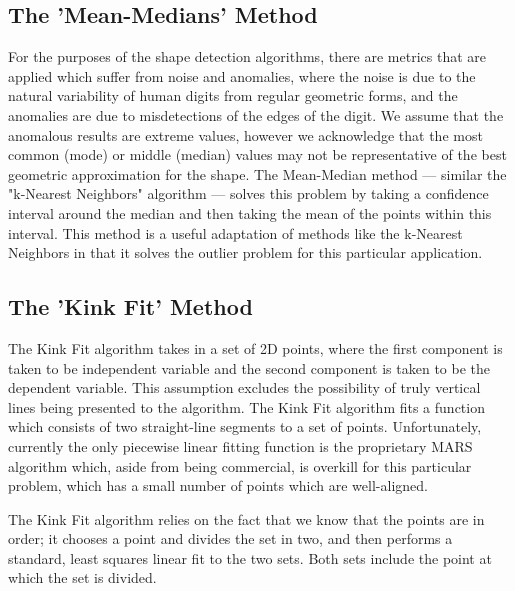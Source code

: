 \subsection{The 'Mean-Medians' Method}\label{sec:MeanMedians}
For the purposes of the shape detection algorithms, there are metrics that are applied which suffer from noise and anomalies, where the noise is due to the natural variability of human digits from regular geometric forms, and the anomalies are due to misdetections of the edges of the digit. We assume that the anomalous results are extreme values, however we acknowledge that the most common (mode) or middle (median) values may not be representative of the best geometric approximation for the shape. The Mean-Median method --- similar the "k-Nearest Neighbors" algorithm --- solves this problem by taking a confidence interval around the median and then taking the mean of the points within this interval. This method is a useful adaptation of methods like the k-Nearest Neighbors in that it solves the outlier problem for this particular application.

\subsection{The 'Kink Fit' Method}\label{sec:KinkFitMethod}
The Kink Fit algorithm takes in a set of 2D points, where the first component is taken to be independent variable and the second component is taken to be the dependent variable. This assumption excludes the possibility of truly vertical lines being presented to the algorithm. The Kink Fit algorithm fits a function which consists of two straight-line segments to a set of points. Unfortunately, currently the only piecewise linear fitting function is the proprietary MARS algorithm which, aside from being commercial, is overkill for this particular problem, which has a small number of points which are well-aligned. 

The Kink Fit algorithm relies on the fact that we know that the points are in order; it chooses a point and divides the set in two, and then performs a standard, least squares linear fit to the two sets. Both sets include the point at which the set is divided. 

